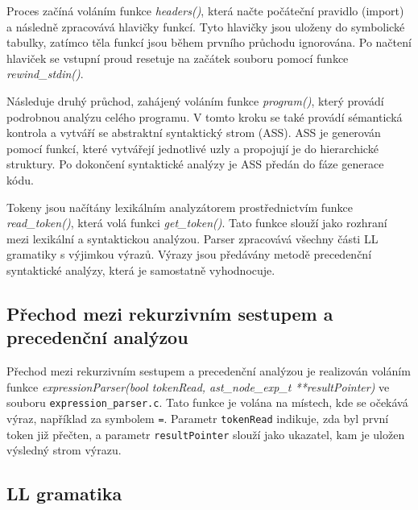 \documentclass[a4paper, 12pt]{article}
\begin{document}
Proces začíná voláním funkce \textit{headers()}, která načte počáteční pravidlo (import) a následně zpracovává hlavičky funkcí. Tyto hlavičky jsou uloženy do symbolické tabulky, zatímco těla funkcí jsou během prvního průchodu ignorována. Po načtení hlaviček se vstupní proud resetuje na začátek souboru pomocí funkce \textit{rewind\_stdin()}.

Následuje druhý průchod, zahájený voláním funkce \textit{program()}, který provádí podrobnou analýzu celého programu. V tomto kroku se také provádí sémantická kontrola a vytváří se abstraktní syntaktický strom (ASS). ASS je generován pomocí funkcí, které vytvářejí jednotlivé uzly a propojují je do hierarchické struktury. Po dokončení syntaktické analýzy je ASS předán do fáze generace kódu.

Tokeny jsou načítány lexikálním analyzátorem prostřednictvím funkce \textit{read\_token()}, která volá funkci \textit{get\_token()}. Tato funkce slouží jako rozhraní mezi lexikální a syntaktickou analýzou. Parser zpracovává všechny části LL gramatiky s výjimkou výrazů. Výrazy jsou předávány metodě precedenční syntaktické analýzy, která je samostatně vyhodnocuje.

\subsection{Přechod mezi rekurzivním sestupem a precedenční analýzou}
Přechod mezi rekurzivním sestupem a precedenční analýzou je realizován voláním funkce \textit{expressionParser(bool tokenRead, ast\_node\_exp\_t **resultPointer)} ve souboru \texttt{expression\_parser.c}. Tato funkce je volána na místech, kde se očekává výraz, například za symbolem \texttt{=}. Parametr \texttt{tokenRead} indikuje, zda byl první token již přečten, a parametr \texttt{resultPointer} slouží jako ukazatel, kam je uložen výsledný strom výrazu.

\vspace{4cm}

\newpage

\subsection{LL gramatika}
\end{document}

